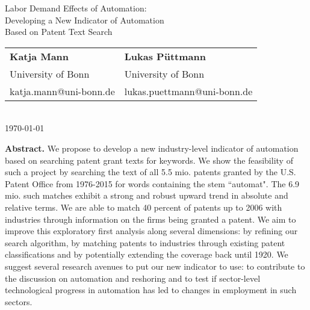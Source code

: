 \documentclass[11pt,a4paper,fleqn]{article}
\begin{document}
\vspace*{2cm}




\thispagestyle{empty}


\begin{center}
\thispagestyle{empty}
{\huge Labor Demand Effects of Automation:\\[0.2cm] Developing a New Indicator of Automation \\[0.2cm] Based on Patent Text Search}\\[1cm]
\begin{tabular}{l@{\hskip 0.6in}l}
\textbf{{\large Katja Mann}} & \textbf{{\large Lukas Püttmann}}\\
{\small University of Bonn} & {\small University of Bonn}\\
{\small katja.mann@uni-bonn.de} & {\small lukas.puettmann@uni-bonn.de}\\
\end{tabular}\\[0.7cm]
{\large \today}\\[0.7cm]
\end{center}


\vspace*{1.1cm}
\begin{center}
\begin{minipage}{0.65\textwidth}
\textbf{Abstract.} We propose to develop a new industry-level indicator of automation based on searching patent grant texts for keywords. We show the feasibility of such a project by searching the text of all 5.5 mio. patents granted by the U.S. Patent Office from 1976-2015 for words containing the stem ``automat". The 6.9 mio. such matches exhibit a strong and robust upward trend in absolute and relative terms. We are able to match 40 percent of patents up to 2006 with industries through information on the firms being granted a patent. We aim to improve this exploratory first analysis along several dimensions: by refining our search algorithm, by matching patents to industries through existing patent classifications and by potentially extending the coverage back until 1920. We suggest several research avenues to put our new indicator to use: to contribute to the discussion on automation and reshoring and to test if sector-level technological progress in automation has led to changes in employment in such sectors.
\end{minipage}
\end{center}

\end{document}
